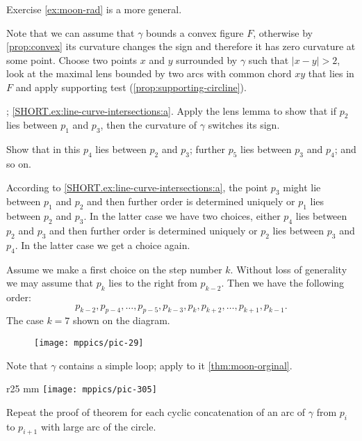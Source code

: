 Exercise \ref{ex:moon-rad} is a more general. 

Note that we can assume that $\gamma$ bounds a convex figure $F$, otherwise by \ref{prop:convex} its curvature changes the sign and therefore it has zero curvature at some point.
Choose two points $x$ and $y$ surrounded by $\gamma$ such that $|x-y|>2$,
look at the maximal lens bounded by two arcs with common chord $xy$ that lies in $F$ and apply supporting test (\ref{prop:supporting-circline}).

\parbf{\ref{ex:line-curve-intersections}}; \ref{SHORT.ex:line-curve-intersections:a}.
Apply the lens lemma to show that if $p_2$ lies between $p_1$ and $p_3$, then the curvature of $\gamma$ switches its sign.

 Show that in this $p_4$ lies between $p_2$ and $p_3$;
further $p_5$ lies between $p_3$ and $p_4$;
and so on.

According to \ref{SHORT.ex:line-curve-intersections:a}, the point $p_3$ might lie between $p_1$ and $p_2$ and then further order is determined uniquely or $p_1$ lies between $p_2$ and $p_3$.
In the latter case we have two choices, either $p_4$ lies between $p_2$ and $p_3$ and then further order is determined uniquely or $p_2$ lies between $p_3$ and $p_4$.
In the latter case we get a choice again.

Assume we make a first choice on the step number $k$.
Without loss of generality we may assume that $p_k$ lies to the right from $p_{k-2}$.
Then we have the following order:
\[
p_{k-2},p_{p-4},\dots,p_{p-5},p_{k-3},p_k,p_{k+2},\dots,p_{k+1},p_{k-1}.
\]
The case $k=7$ shown on the diagram.

\begin{figure}[h!]
\vskip-0mm
\centering
\texttt{[image: mppics/pic-29]}
\vskip0mm
\end{figure}

 Note that $\gamma$ contains a simple loop; apply to it \ref{thm:moon-orginal}.

\begin{wrapfigure}{r}{25 mm}
\vskip-0mm
\centering
\texttt{[image: mppics/pic-305]}
\vskip0mm
\end{wrapfigure}

Repeat the proof of theorem for each cyclic concatenation of an arc of $\gamma$ from $p_i$ to $p_{i+1}$ with large arc of the circle. 

